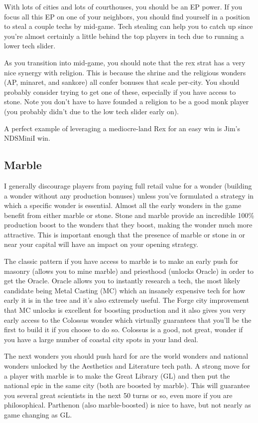 \documentclass[10pt]{article}
\begin{document}
With lots of cities and lots of courthouses, you should be an EP
power. If you focus all this EP on one of your neighbors, you should
find yourself in a position to steal a couple techs by mid-game. Tech
stealing can help you to catch up since you're almost certainly a
little behind the top players in tech due to running a lower tech
slider.

As you transition into mid-game, you should note that the rex strat
has a very nice synergy with religion. This is because the shrine and
the religious wonders (AP, minaret, and sankore) all confer bonuses
that scale per-city. You should probably consider trying to get one of
these, especially if you have access to stone. Note you don't have to
have founded a religion to be a good monk player (you probably didn't
due to the low tech slider early on).

A perfect example of leveraging a mediocre-land Rex for an easy win is Jim's NDSMiniI win.

\subsection*{Marble}

I generally discourage players from paying full retail value for a
wonder (building a wonder without any production bonuses) unless
you've formulated a strategy in which a specific wonder is essential.
Almost all the early wonders in the game benefit from either marble or
stone. Stone and marble provide an incredible 100\% production boost
to the wonders that they boost, making the wonder much more
attractive. This is important enough that the presence of marble or
stone in or near your capital will have an impact on your opening
strategy.

The classic pattern if you have access to marble is to make an early
push for masonry (allows you to mine marble) and priesthood (unlocks
Oracle) in order to get the Oracle. Oracle allows you to instantly
research a tech, the most likely candidate being Metal Casting (MC)
which an insanely expensive tech for how early it is in the tree and
it's also extremely useful. The Forge city improvement that MC unlocks
is excellent for boosting production and it also gives you very early
access to the Colossus wonder which virtually guarantees that you'll
be the first to build it if you choose to do so. Colossus is a good,
not great, wonder if you have a large number of coastal city spots in
your land deal.

The next wonders you should push hard for are the world wonders and
national wonders unlocked by the Aesthetics and Literature tech
path. A strong move for a player with marble is to make the Great
Library (GL) and then put the national epic in the same city (both are
boosted by marble). This will guarantee you several great scientists
in the next 50 turns or so, even more if you are
philosophical. Parthenon (also marble-boosted) is nice to have, but
not nearly as game changing as GL.
\end{document}

